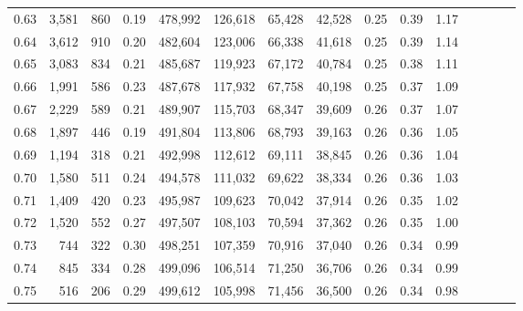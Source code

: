 \begin{tabular}{rrrcrrrrrrrrrrr}
0.63 &   3,581 &     860 &                                       0.19 &  478,992 &  126,618 &   65,428 &   42,528 &  0.25 &  0.39 &                         1.17 \\
0.64 &   3,612 &     910 &                                       0.20 &  482,604 &  123,006 &   66,338 &   41,618 &  0.25 &  0.39 &                         1.14 \\
0.65 &   3,083 &     834 &                                       0.21 &  485,687 &  119,923 &   67,172 &   40,784 &  0.25 &  0.38 &                         1.11 \\
0.66 &   1,991 &     586 &                                       0.23 &  487,678 &  117,932 &   67,758 &   40,198 &  0.25 &  0.37 &                         1.09 \\
0.67 &   2,229 &     589 &                                       0.21 &  489,907 &  115,703 &   68,347 &   39,609 &  0.26 &  0.37 &                         1.07 \\
0.68 &   1,897 &     446 &                                       0.19 &  491,804 &  113,806 &   68,793 &   39,163 &  0.26 &  0.36 &                         1.05 \\
0.69 &   1,194 &     318 &                                       0.21 &  492,998 &  112,612 &   69,111 &   38,845 &  0.26 &  0.36 &                         1.04 \\
0.70 &   1,580 &     511 &                                       0.24 &  494,578 &  111,032 &   69,622 &   38,334 &  0.26 &  0.36 &                         1.03 \\
0.71 &   1,409 &     420 &                                       0.23 &  495,987 &  109,623 &   70,042 &   37,914 &  0.26 &  0.35 &                         1.02 \\
0.72 &   1,520 &     552 &                                       0.27 &  497,507 &  108,103 &   70,594 &   37,362 &  0.26 &  0.35 &                         1.00 \\
0.73 &     744 &     322 &                                       0.30 &  498,251 &  107,359 &   70,916 &   37,040 &  0.26 &  0.34 &                         0.99 \\
0.74 &     845 &     334 &                                       0.28 &  499,096 &  106,514 &   71,250 &   36,706 &  0.26 &  0.34 &                         0.99 \\
0.75 &     516 &     206 &                                       0.29 &  499,612 &  105,998 &   71,456 &   36,500 &  0.26 &  0.34 &                         0.98 \\

\end{tabular}
